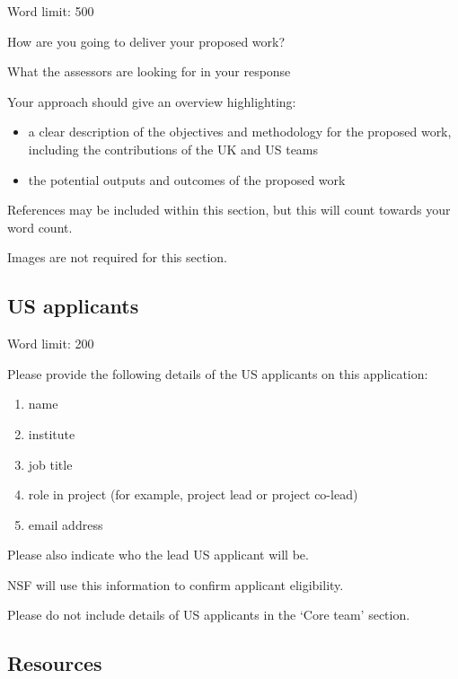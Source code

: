 \documentclass[12in]{article}
\begin{document}
{\color{red}
Word limit: 500

How are you going to deliver your proposed work?

What the assessors are looking for in your response

Your approach should give an overview highlighting:

\begin{itemize}

	\item a clear description of the objectives and methodology for the
proposed work, including the contributions of the UK and US teams

	\item the potential outputs and outcomes of the proposed work

\end{itemize}

References may be included within this section, but this will count towards your
word count.

Images are not required for this section.
}



\subsection{US applicants}

{\color{red}

Word limit: 200

Please provide the following details of the US applicants on this application:

\begin{enumerate}
	\item name
	\item institute
	\item job title
	\item role in project (for example, project lead or project co-lead)
	\item email address
\end{enumerate}

Please also indicate who the lead US applicant will be.

NSF will use this information to confirm applicant eligibility.

Please do not include details of US applicants in the ‘Core team’ section.

}

\subsection{Resources}
\end{document}
